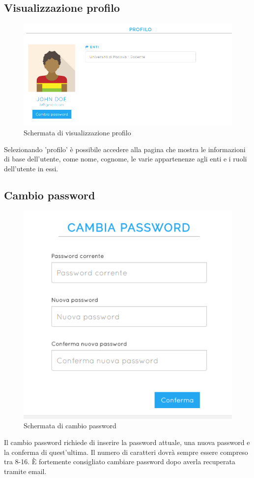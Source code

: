 \documentclass[a4paper, titlepage]{article}
\begin{document}
	 \subsection{Visualizzazione profilo}
	 \begin{figure}[!h]
	 	\centering
	 	\includegraphics[scale=0.33]{Img/screen_ProfiloUtente.png}
	 	\caption{Schermata di visualizzazione profilo}
	 \end{figure}
	 Selezionando 'profilo' è possibile accedere alla pagina che mostra le informazioni di base dell'utente, come nome, cognome, le varie appartenenze agli enti e i ruoli dell'utente in essi.
	
	\subsection{Cambio password}
	
	\begin{figure}[!h]
		\centering
		\includegraphics[scale=0.33]{Img/screen_CambioPassword.png}
		\caption{Schermata di cambio password}
	\end{figure}
	Il cambio password richiede di inserire la password attuale, una nuova password e la conferma di quest'ultima. Il numero di caratteri dovrà sempre essere compreso tra 8-16. È fortemente consigliato cambiare password dopo averla recuperata tramite email.
	
\end{document}
